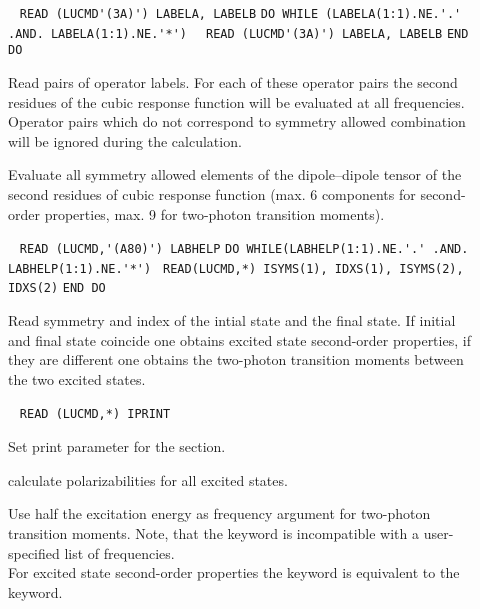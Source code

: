 \begin{description}
\item[] \verb| |\newline
\verb|READ (LUCMD'(3A)') LABELA, LABELB|\newline
\verb|DO WHILE (LABELA(1:1).NE.'.' .AND. LABELA(1:1).NE.'*')|\newline
\verb|  READ (LUCMD'(3A)') LABELA, LABELB|\newline
\verb|END DO|

Read pairs of operator labels.
For each of these operator pairs the second residues of the cubic response
function will be evaluated at all frequencies.
Operator pairs which do not correspond to symmetry allowed
combination will be ignored during the calculation.
 
\item[] 
Evaluate all symmetry allowed elements of the dipole--dipole tensor
of the second residues of cubic response function 
(max. 6 components for second-order properties, 
 max. 9 for two-photon transition moments).
 
\item[] \verb| |\newline
\verb|READ (LUCMD,'(A80)') LABHELP|\newline
\verb|DO WHILE(LABHELP(1:1).NE.'.' .AND. LABHELP(1:1).NE.'*')|\newline
\verb| READ(LUCMD,*) ISYMS(1), IDXS(1), ISYMS(2), IDXS(2)|\newline
\verb|END DO|

Read symmetry and index of the intial state and the final state.
If initial and final state coincide one obtains excited state
second-order properties, if they are different one obtains the
two-photon transition moments between the two excited states.
 
\item[] \verb| |\newline
\verb|READ (LUCMD,*) IPRINT|

Set print parameter for the  section.
 
\item[] 
calculate polarizabilities for all excited states.
 
\item[] 
Use half the excitation energy as frequency argument for two-photon
transition moments.
Note, that the  keyword is incompatible with a 
user-specified list of frequencies. \\
For excited state second-order properties the  keyword is
equivalent to the  keyword.
 

\end{description}

